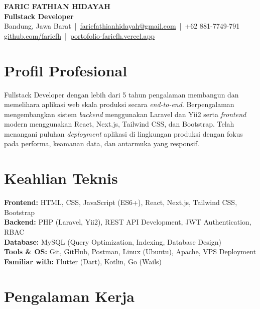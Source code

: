 \documentclass[11pt,a4paper]{article}
\begin{document}
\begin{center}
  {\LARGE \textbf{FARIC FATHIAN HIDAYAH}}\\
  \vspace{4pt}
  \textbf{Fullstack Developer} \\
  \vspace{6pt}
  Bandung, Jawa Barat \,|\, 
  \href{mailto:faricfathianhidayah@gmail.com}{faricfathianhidayah@gmail.com} \,|\, 
  +62 881-7749-791 \\
  \href{https://github.com/faricfh}{github.com/faricfh} \,|\, 
  \href{https://portofolio-faricfh.vercel.app}{portofolio-faricfh.vercel.app}
\end{center}

\section*{Profil Profesional}
Fullstack Developer dengan lebih dari 5 tahun pengalaman membangun dan memelihara aplikasi web skala produksi secara \textit{end-to-end}. Berpengalaman mengembangkan sistem \textit{backend} menggunakan Laravel dan Yii2 serta \textit{frontend} modern menggunakan React, Next.js, Tailwind CSS, dan Bootstrap. Telah menangani puluhan \textit{deployment} aplikasi di lingkungan produksi dengan fokus pada performa, keamanan data, dan antarmuka yang responsif.

\section*{Keahlian Teknis}
\textbf{Frontend:} HTML, CSS, JavaScript (ES6+), React, Next.js, Tailwind CSS, Bootstrap \\
\textbf{Backend:} PHP (Laravel, Yii2), REST API Development, JWT Authentication, RBAC \\
\textbf{Database:} MySQL (Query Optimization, Indexing, Database Design) \\
\textbf{Tools \& OS:} Git, GitHub, Postman, Linux (Ubuntu), Apache, VPS Deployment \\
\textbf{Familiar with:} Flutter (Dart), Kotlin, Go (Wails)

\section*{Pengalaman Kerja}
\end{document}
